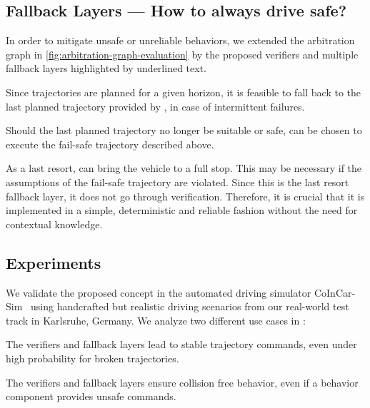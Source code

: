 


\subsection{Fallback Layers --- How to always \textbf{drive safe}?}

In order to mitigate unsafe or unreliable behaviors,
we extended the arbitration graph in \cref{fig:arbitration-graph-evaluation}
by the proposed verifiers and multiple fallback layers
highlighted by underlined text.

Since trajectories are planned for a given horizon,
it is feasible to fall back to the last planned trajectory
provided by ,
in case of intermittent failures.

Should the last planned trajectory no longer be suitable or safe,
 can be chosen to execute the fail-safe trajectory described above.

As a last resort,  can bring the vehicle to a full stop.
This may be necessary if the assumptions of the fail-safe trajectory are violated.
%
Since this is the last resort fallback layer,
it does not go through verification.
Therefore, it is crucial that it is implemented in a simple, deterministic and reliable fashion
without the need for contextual knowledge.




\subsection{Experiments}

We validate the proposed concept in the automated driving simulator CoInCar-Sim~\cite{naumannCoInCarSimOpenSourceSimulation2018}
using handcrafted but realistic driving scenarios
from our real-world test track in Karlsruhe, Germany.
We analyze two different use cases
in \cite{orzechowskiVerhaltensentscheidungFuerAutomatisierte2023}:
%
\begin{description}[align=left]
    \item[Ensuring driveability]
        The verifiers and fallback layers lead to stable trajectory commands,
        even under high probability for broken trajectories.
    \item[Guaranteeing vehicle safety]
        The verifiers and fallback layers ensure collision free behavior,
        even if a behavior component provides unsafe commands.
\end{description}

